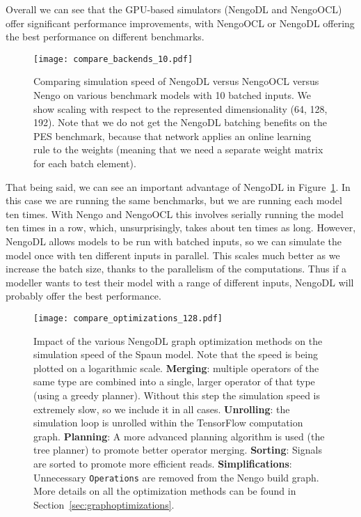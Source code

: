 \documentclass{article}
\begin{document}
Overall we can see that the GPU-based simulators (NengoDL and NengoOCL) offer significant performance improvements, with NengoOCL or NengoDL offering the best performance on different benchmarks.

\begin{figure}
\centering
\texttt{[image: compare\_backends\_10.pdf]}
\caption{Comparing simulation speed of NengoDL versus NengoOCL versus Nengo on various benchmark models with 10 batched inputs.  We show scaling with respect to the represented dimensionality (64, 128, 192).  Note that we do not get the NengoDL batching benefits on the PES benchmark, because that network applies an online learning rule to the weights (meaning that we need a separate weight matrix for each batch element).}
\label{fig:compare_backends_10}
\end{figure}

That being said, we can see an important advantage of NengoDL in Figure~\ref{fig:compare_backends_10}.  In this case we are running the same benchmarks, but we are running each model ten times.  With Nengo and NengoOCL this involves serially running the model ten times in a row, which, unsurprisingly, takes about ten times as long.  However, NengoDL allows models to be run with batched inputs, so we can simulate the model once with ten different inputs in parallel.  This scales much better as we increase the batch size, thanks to the parallelism of the computations.  Thus if a modeller wants to test their model with a range of different inputs, NengoDL will probably offer the best performance.

\begin{figure}
\centering
\texttt{[image: compare\_optimizations\_128.pdf]}
\caption{Impact of the various NengoDL graph optimization methods on the simulation speed of the Spaun model.  Note that the speed is being plotted on a logarithmic scale.  {\bf Merging}: multiple operators of the same type are combined into a single, larger operator of that type (using a greedy planner).  Without this step the simulation speed is extremely slow, so we include it in all cases.  {\bf Unrolling}: the simulation loop is unrolled within the TensorFlow computation graph.  {\bf Planning}: A more advanced planning algorithm is used (the tree planner) to promote better operator merging.  {\bf Sorting}: Signals are sorted to promote more efficient reads.  {\bf Simplifications}: Unnecessary \texttt{Operations} are removed from the Nengo build graph.  More details on all the optimization methods can be found in Section~\ref{sec:graphoptimizations}.}
\label{fig:compare_optimizations}
\end{figure}
\end{document}
